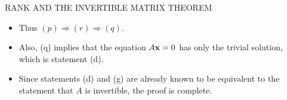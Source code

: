 \begin{frame}{RANK AND THE INVERTIBLE MATRIX THEOREM}
\begin{itemize}
\item Thus $(p)\Rightarrow(r)\Rightarrow(q)$.
\item Also, (q) implies that the equation $A\mathbf{x}=0$ has only the trivial solution, which is statement (d).
\item Since statements (d) and (g) are already known to be equivalent to the statement that $A$ is invertible, the proof is complete.
\end{itemize}
\end{frame}
